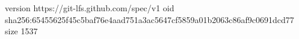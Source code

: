 version https://git-lfs.github.com/spec/v1
oid sha256:65455625f45c5baf76e4aad751a3ac5647cf5859a01b2063c86af9c0691dcd77
size 1537
